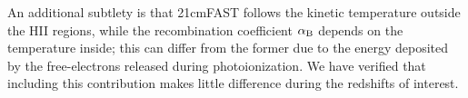 An additional subtlety is that 21cmFAST follows the kinetic temperature outside the HII regions, while the recombination coefficient $\alpha_{\rm B}$ depends on the temperature inside; this can differ from the former due to the energy deposited by the free-electrons released during photoionization. We have verified that including this contribution makes little difference during the redshifts of interest.
